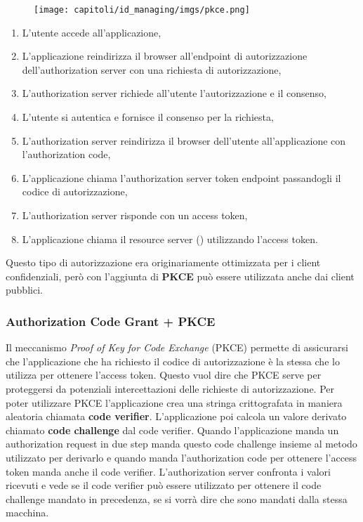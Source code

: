 \begin{figure}[H]
      \centering
      \texttt{[image: capitoli/id\_managing/imgs/pkce.png]}
\end{figure}

\begin{enumerate}
      \item L'utente accede all'applicazione,
      \item L'applicazione reindirizza il browser all'endpoint di autorizzazione
            dell'authorization server con una richiesta di autorizzazione,
      \item L'authorization server richiede all'utente l'autorizzazione e il consenso,
      \item L'utente si autentica e fornisce il consenso per la richiesta,
      \item L'authorization server reindirizza il browser dell'utente all'applicazione
            con l'authorization code,
      \item L'applicazione chiama l'authorization server token endpoint passandogli
            il codice di autorizzazione,
      \item L'authorization server risponde con un access token,
      \item L'applicazione chiama il resource server (\api{}) utilizzando l'access token.
\end{enumerate}

Questo tipo di autorizzazione era originariamente ottimizzata per i
client confidenziali, però con l'aggiunta di \textbf{PKCE} può essere utilizzata anche dai
client pubblici.

\subsubsection{Authorization Code Grant + PKCE}

Il meccanismo \textit{Proof of Key for Code Exchange} (PKCE) permette di assicurarsi
che l'applicazione che ha richiesto il codice di autorizzazione è la stessa che lo
utilizza per ottenere l'access token. Questo vuol dire che PKCE serve per proteggersi
da potenziali intercettazioni delle richieste di autorizzazione.
Per poter utilizzare PKCE l'applicazione crea una stringa crittografata in maniera
aleatoria chiamata \textbf{code verifier}. L'applicazione poi calcola un valore derivato
chiamato \textbf{code challenge} dal code verifier. Quando l'applicazione manda un
authorization request in due step manda questo code challenge insieme al metodo utilizzato
per derivarlo e quando manda l'authorization code per ottenere l'access token manda anche
il code verifier. L'authorization server confronta i valori ricevuti e vede se
il code verifier può essere utilizzato per ottenere il code challenge mandato in precedenza,
se si vorrà dire che sono mandati dalla stessa macchina.\\

